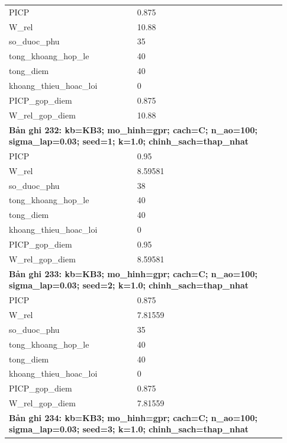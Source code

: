 \begin{longtable}{p{0.43\linewidth}p{0.50\linewidth}}
PICP & 0.875 \\
W\_\allowbreak rel & 10.88 \\
so\_\allowbreak duoc\_\allowbreak phu & 35 \\
tong\_\allowbreak khoang\_\allowbreak hop\_\allowbreak le & 40 \\
tong\_\allowbreak diem & 40 \\
khoang\_\allowbreak thieu\_\allowbreak hoac\_\allowbreak loi & 0 \\
PICP\_\allowbreak gop\_\allowbreak diem & 0.875 \\
W\_\allowbreak rel\_\allowbreak gop\_\allowbreak diem & 10.88 \\
\midrule
\multicolumn{2}{p{0.95\linewidth}}{\textbf{Bản ghi 232: kb=KB3; mo\_hinh=gpr; cach=C; n\_ao=100; sigma\_lap=0.03; seed=1; k=1.0; chinh\_sach=thap\_nhat}} \\
PICP & 0.95 \\
W\_\allowbreak rel & 8.59581 \\
so\_\allowbreak duoc\_\allowbreak phu & 38 \\
tong\_\allowbreak khoang\_\allowbreak hop\_\allowbreak le & 40 \\
tong\_\allowbreak diem & 40 \\
khoang\_\allowbreak thieu\_\allowbreak hoac\_\allowbreak loi & 0 \\
PICP\_\allowbreak gop\_\allowbreak diem & 0.95 \\
W\_\allowbreak rel\_\allowbreak gop\_\allowbreak diem & 8.59581 \\
\midrule
\multicolumn{2}{p{0.95\linewidth}}{\textbf{Bản ghi 233: kb=KB3; mo\_hinh=gpr; cach=C; n\_ao=100; sigma\_lap=0.03; seed=2; k=1.0; chinh\_sach=thap\_nhat}} \\
PICP & 0.875 \\
W\_\allowbreak rel & 7.81559 \\
so\_\allowbreak duoc\_\allowbreak phu & 35 \\
tong\_\allowbreak khoang\_\allowbreak hop\_\allowbreak le & 40 \\
tong\_\allowbreak diem & 40 \\
khoang\_\allowbreak thieu\_\allowbreak hoac\_\allowbreak loi & 0 \\
PICP\_\allowbreak gop\_\allowbreak diem & 0.875 \\
W\_\allowbreak rel\_\allowbreak gop\_\allowbreak diem & 7.81559 \\
\midrule
\multicolumn{2}{p{0.95\linewidth}}{\textbf{Bản ghi 234: kb=KB3; mo\_hinh=gpr; cach=C; n\_ao=100; sigma\_lap=0.03; seed=3; k=1.0; chinh\_sach=thap\_nhat}} \\

\end{longtable}
